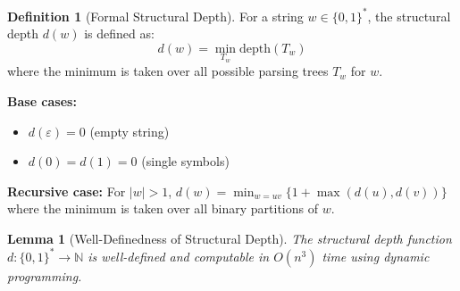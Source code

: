 \documentclass[11pt]{article}
\newtheorem{lemma}[theorem]{Lemma}
\theoremstyle{plain}
\theoremstyle{definition}
\newtheorem{definition}[theorem]{Definition}
\begin{document}
\begin{definition}[Formal Structural Depth]
For a string $w \in \{0,1\}^*$, the structural depth $d(w)$ is defined as:
$$d(w) = \min_{T_w} \text{depth}(T_w)$$
where the minimum is taken over all possible parsing trees $T_w$ for $w$.

\textbf{Base cases:}
\begin{itemize}
\item $d(\varepsilon) = 0$ (empty string)
\item $d(0) = d(1) = 0$ (single symbols)
\end{itemize}

\textbf{Recursive case:}
For $|w| > 1$, $d(w) = \min_{w=uv} \{1 + \max(d(u), d(v))\}$ where the minimum is taken over all binary partitions of $w$.
\end{definition}

\begin{lemma}[Well-Definedness of Structural Depth]
The structural depth function $d: \{0,1\}^* \to \mathbb{N}$ is well-defined and computable in $O(n^3)$ time using dynamic programming.
\end{lemma}
\end{document}
